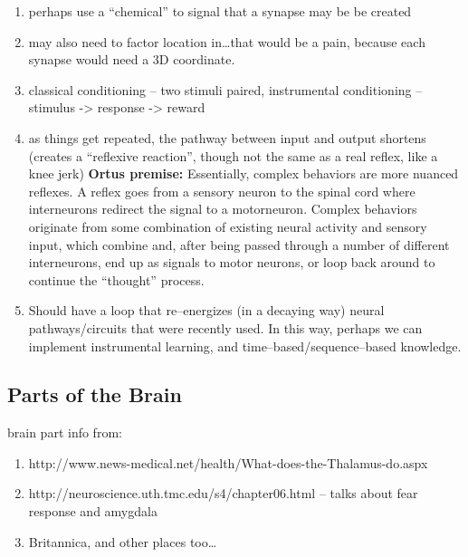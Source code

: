 \documentclass[11pt, a4paper, oneside]{article}   	%
\begin{document}
\begin{enumerate}
\item perhaps use a ``chemical'' to signal that a synapse may be be created
\item may also need to factor location in\ldots that would be a pain, because each synapse would need a 3D coordinate.
\item classical conditioning -- two stimuli paired, instrumental conditioning -- stimulus -> response -> reward
\item as things get repeated, the pathway between input and output shortens (creates a ``reflexive reaction'', though not the same as a real reflex, like a knee jerk)
  \subitem \textbf{Ortus premise:} Essentially, complex behaviors are more nuanced reflexes. A reflex goes from a sensory neuron to the spinal cord where interneurons redirect the signal to a motorneuron. Complex behaviors originate from some combination of existing neural activity and sensory input, which combine and, after being passed through a number of different interneurons, end up as signals to motor neurons, or loop back around to continue the ``thought'' process.
\item Should have a loop that re--energizes (in a decaying way) neural pathways/circuits that were recently used. In this way, perhaps we can implement instrumental learning, and time--based/sequence--based knowledge.
\end{enumerate}



\subsection{Parts of the Brain}

brain part info from:

\begin{enumerate}
    \item http://www.news-medical.net/health/What-does-the-Thalamus-do.aspx
    \item http://neuroscience.uth.tmc.edu/s4/chapter06.html -- talks about fear response and amygdala
    \item Britannica, and other places too\ldots
\end{enumerate}
\end{document}
